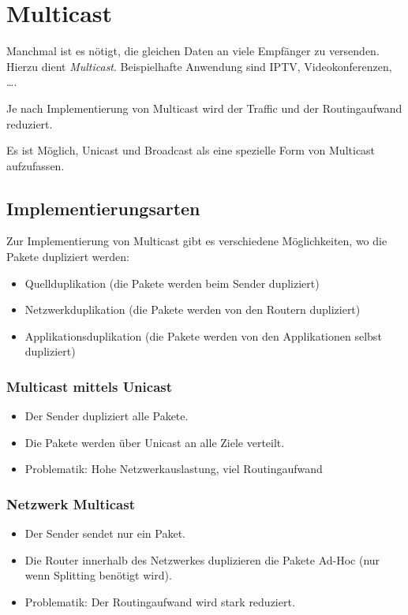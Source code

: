 \chapter{Multicast}
    Manchmal ist es nötigt, die gleichen Daten an viele Empfänger zu versenden. Hierzu dient \textit{Multicast}. Beispielhafte Anwendung sind IPTV, Videokonferenzen, \dots.
    
    Je nach Implementierung von Multicast wird der Traffic und der Routingaufwand reduziert.
    
    Es ist Möglich, Unicast und Broadcast als eine spezielle Form von Multicast aufzufassen.

    \section{Implementierungsarten}
        Zur Implementierung von Multicast gibt es verschiedene Möglichkeiten, wo die Pakete dupliziert werden:
        \begin{itemize}
        	\item Quellduplikation (die Pakete werden beim Sender dupliziert)
        	\item Netzwerkduplikation (die Pakete werden von den Routern dupliziert)
        	\item Applikationsduplikation (die Pakete werden von den Applikationen selbst dupliziert)
        \end{itemize}

        \subsection{Multicast mittels Unicast}
            \begin{itemize}
            	\item Der Sender dupliziert alle Pakete.
            	\item Die Pakete werden über Unicast an alle Ziele verteilt.
            	\item Problematik: Hohe Netzwerkauslastung, viel Routingaufwand
            \end{itemize}

        \subsection{Netzwerk Multicast}
            \begin{itemize}
            	\item Der Sender sendet nur ein Paket.
            	\item Die Router innerhalb des Netzwerkes duplizieren die Pakete Ad-Hoc (nur wenn Splitting benötigt wird).
            	\item Problematik: Der Routingaufwand wird stark reduziert.
            \end{itemize}

